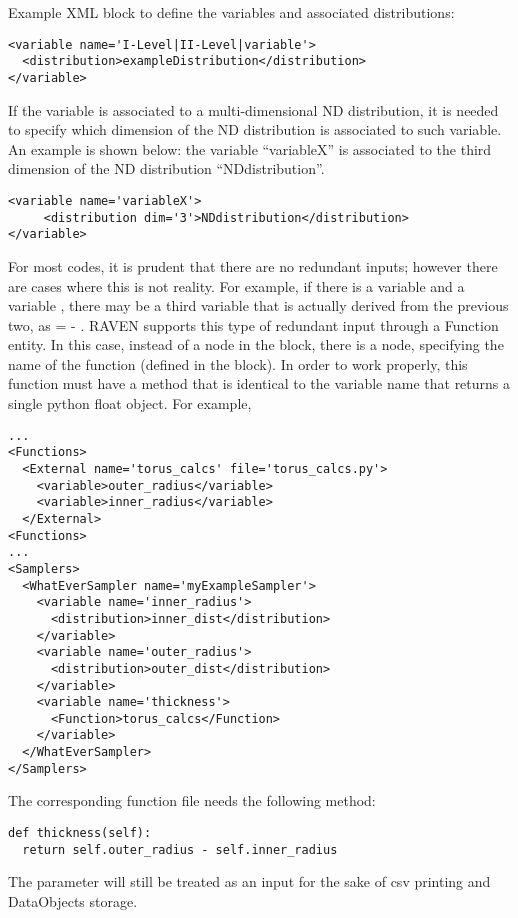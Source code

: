 Example XML block to define the variables and associated distributions:
\begin{lstlisting}[style=XML]
<variable name='I-Level|II-Level|variable'>
  <distribution>exampleDistribution</distribution>
</variable>
\end{lstlisting}

If the variable is associated to a multi-dimensional ND distribution, it is needed to specify which dimension of the ND distribution is associated to such variable. An example is shown below: the variable  ``variableX'' is associated to the third dimension of the ND distribution ``NDdistribution''.

\begin{lstlisting}[style=XML]
<variable name='variableX'>
     <distribution dim='3'>NDdistribution</distribution>
</variable>
\end{lstlisting}

For most codes, it is prudent that there are no redundant inputs; however there are
cases where this is not reality.  For example, if there is a variable  and
a variable , there may be a third variable  that
is actually derived from the previous two, as  =  - .
RAVEN supports this type of redundant input through a Function entity.  In this case,
instead of a  node in the  block, there is a
 node, specifying the name of the function (defined in the  block).
In order to work properly, this function must have a method that is identical to the variable name
that returns a single python float object.  For example,
\begin{lstlisting}[style=XML]
...
<Functions>
  <External name='torus_calcs' file='torus_calcs.py'>
    <variable>outer_radius</variable>
    <variable>inner_radius</variable>
  </External>
<Functions>
...
<Samplers>
  <WhatEverSampler name='myExampleSampler'>
    <variable name='inner_radius'>
      <distribution>inner_dist</distribution>
    </variable>
    <variable name='outer_radius'>
      <distribution>outer_dist</distribution>
    </variable>
    <variable name='thickness'>
      <Function>torus_calcs</Function>
    </variable>
  </WhatEverSampler>
</Samplers>
\end{lstlisting}
The corresponding function file  needs the following method:
\begin{lstlisting}
def thickness(self):
  return self.outer_radius - self.inner_radius
\end{lstlisting}
The  parameter will still be treated as an input for the sake of csv
printing and DataObjects storage.

